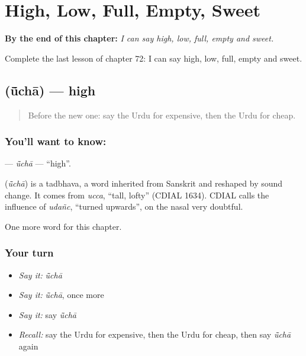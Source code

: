 
\chapter{High, Low, Full, Empty, Sweet}
\label{ch:ur-high-low-full-empty-sweet}

\begin{chapteropening}
\textbf{By the end of this chapter:} \emph{I can say high, low, full, empty and sweet.}

Complete the last lesson of chapter 72: I can say high, low, full, empty and sweet.
\end{chapteropening}

\section[\texorpdfstring{\ur{اونچا} (ū̃chā)}{اونچا (ū̃chā)}]{ (ū̃chā) — high}

\label{lesson:UR-C72-ucha}



\begin{quote}
Before the new one: say the Urdu for expensive, then the Urdu for cheap.
\end{quote}

\subsection*{You'll want to know: }
\textbf{} — \emph{ū̃chā} — \textquotedblleft{}high\textquotedblright{}.

\begin{cousinweb}
\textbf{} (\emph{ū̃chā}) is a tadbhava, a word inherited from Sanskrit and reshaped by sound change. It comes from \emph{ucca}, \textquotedblleft{}tall, lofty\textquotedblright{} (CDIAL 1634). CDIAL calls the influence of \emph{udañc}, \textquotedblleft{}turned upwards\textquotedblright{}, on the nasal very doubtful.
\end{cousinweb}

\begin{grammarlens}[title={What you've built}]
One more word for this chapter.
\end{grammarlens}

\subsection*{Your turn}
\begin{itemize}
\raggedright
  \item \emph{Say it:} \emph{ū̃chā}
  \item \emph{Say it:} \emph{ū̃chā}, once more
  \item \emph{Say it:} say \emph{ū̃chā}
  \item \emph{Recall:} say the Urdu for expensive, then the Urdu for cheap, then say \emph{ū̃chā} again
\end{itemize}

